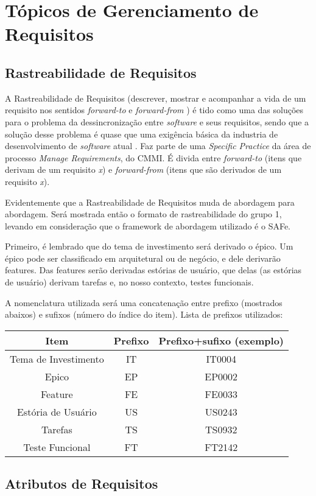 
\chapter[Tópicos de Gerenciamento de Requisitos]{Tópicos de Gerenciamento de Requisitos}
\section{Rastreabilidade de Requisitos}
A Rastreabilidade de Requisitos (descrever, mostrar e acompanhar a vida de um requisito nos sentidos \emph{forward-to} e \emph{forward-from} \cite{garcia001}) é tido como uma das soluções para o problema da dessincronização entre \emph{software} e seus requisitos, sendo que a solução desse problema é quase que uma exigência básica da industria de desenvolvimento de \emph{software} atual \cite{leal001}. Faz parte de uma \emph{Specific Practice} da área de processo \emph{Manage Requirements}, do CMMI. É divida entre \emph{forward-to} (itens que derivam de um requisito \emph{x}) e \emph{forward-from} (itens que são derivados de um requisito \emph{x}).

Evidentemente que a Rastreabilidade de Requisitos muda de abordagem para abordagem. Será mostrada então o formato de rastreabilidade do grupo 1, levando em consideração que o framework de abordagem utilizado é o SAFe.

Primeiro, é lembrado que do tema de investimento será derivado o épico. Um épico pode ser classificado em arquitetural ou de negócio, e dele derivarão features. Das features serão derivadas estórias de usuário, que delas (as estórias de usuário) derivam tarefas e, no nosso contexto, testes funcionais.

A nomenclatura utilizada será uma concatenação entre prefixo (mostrados abaixos) e sufixos (número do índice do item). Lista de prefixos utilizados:

\begin{tabular}{c | c | c}
  \hline
  Item & Prefixo & Prefixo+sufixo (exemplo)\\ \hline
  Tema de Investimento & IT & IT0004 \\
  Epico & EP & EP0002 \\
  Feature & FE & FE0033 \\
  Estória de Usuário & US & US0243 \\
  Tarefas & TS & TS0932 \\
  Teste Funcional & FT & FT2142 \\
  \hline
\end{tabular}

\section{Atributos de Requisitos}
